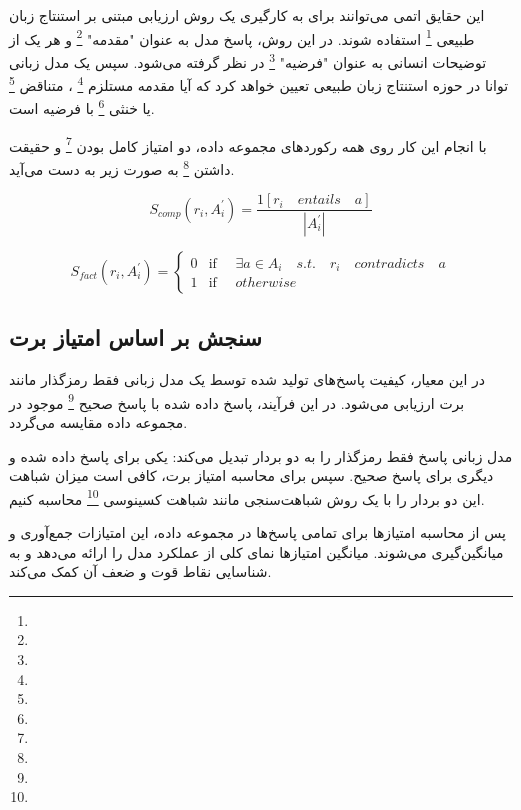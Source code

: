 این حقایق اتمی می‌توانند برای به کارگیری یک روش ارزیابی مبتنی بر استنتاج زبان طبیعی 
\footnote{} 
استفاده شوند. در این روش، پاسخ مدل به عنوان "مقدمه" 
\footnote{} 
و هر یک از توضیحات انسانی به عنوان "فرضیه" 
\footnote{}
 در نظر گرفته می‌شود. سپس یک مدل زبانی توانا در حوزه استنتاج زبان طبیعی تعیین خواهد کرد که آیا مقدمه مستلزم 
 \footnote{}
، متناقض 
 \footnote{}
  یا خنثی 
 \footnote{} 
 با فرضیه است.

با انجام این کار روی همه رکوردهای مجموعه داده، دو امتیاز کامل بودن 
\footnote{}
 و حقیقت داشتن
  \footnote{} 
 به صورت زیر به دست می‌آید.
 
\begin{equation*}
	\label{completeness-formula}
	S_{comp}(r_i,A_i^{\prime}) = \frac{1[r_i \quad entails \quad a]}{|A_i^{\prime}|}
\end{equation*}

\begin{equation*}
	\label{factuality-formula}
	S_{fact}(r_i,A_i^{\prime}) = \begin{cases}
		0 & \text{if } \quad \exists a \in A_i \quad s.t. \quad r_i  \quad contradicts \quad a \\
		1 & \text{if } \quad otherwise
	\end{cases}
\end{equation*}




\subsection{ 
سنجش بر اساس امتیاز برت
}
در این معیار، کیفیت پاسخ‌های تولید شده توسط یک مدل زبانی فقط رمزگذار مانند برت ارزیابی می‌شود.
\cite{b17}
در این فرآیند، پاسخ داده شده با پاسخ صحیح
\footnote{}
 موجود در مجموعه داده مقایسه می‌گردد.

مدل زبانی پاسخ فقط رمزگذار را به دو بردار تبدیل می‌کند: یکی برای پاسخ داده شده و دیگری برای پاسخ صحیح. سپس برای محاسبه امتیاز برت، کافی است میزان شباهت این دو بردار را با یک روش شباهت‌سنجی مانند شباهت کسینوسی
\footnote{}
 محاسبه کنیم.

پس از محاسبه امتیازها برای تمامی پاسخ‌ها در مجموعه داده، این امتیازات جمع‌آوری و میانگین‌گیری می‌شوند. میانگین امتیازها نمای کلی از عملکرد مدل را ارائه می‌دهد و به شناسایی نقاط قوت و ضعف آن کمک می‌کند.


